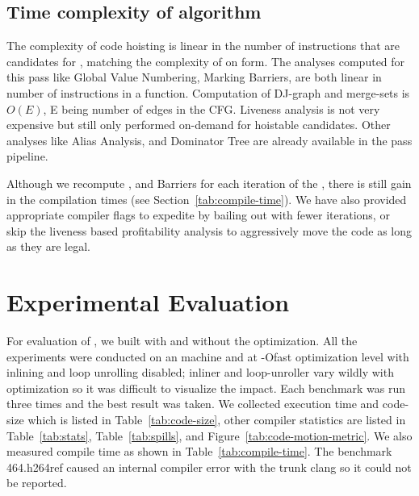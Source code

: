 \documentclass[sigplan,10pt,review,anonymous]{acmart}\settopmatter{printfolios=true,printccs=false,printacmref=false}
\begin{document}
\subsection{Time complexity of algorithm}
The complexity of code hoisting is linear in the number of instructions that are
candidates for \gcm{}, matching the complexity of \PRE{} on \SSA{} form.  The
analyses computed for this pass like Global Value Numbering, Marking Barriers,
are both linear in number of instructions in a function. Computation of DJ-graph
and merge-sets is $O(E)$, E being number of edges in the CFG. Liveness analysis
is not very expensive \cite{das2012} but still only performed on-demand for
hoistable candidates. Other analyses like Alias Analysis, \MemorySSA{} and
Dominator Tree are already available in the \LLVM{} pass pipeline.

Although we recompute \GVN{}, and Barriers for each iteration of the \gcm{},
there is still gain in the compilation times (see
Section~\ref{tab:compile-time}). We have also provided appropriate compiler
flags to expedite \gcm{} by bailing out with fewer iterations, or skip the
liveness based profitability analysis to aggressively move the code as long as
they are legal.

\section{Experimental Evaluation}
\label{sec:experimental-results}
For evaluation of \gcm{}, we built \SPEC{} with and without the \GCM{}
optimization. All the experiments were conducted on an \xlinux{} machine and at
-Ofast optimization level with inlining and loop unrolling disabled; inliner and
loop-unroller vary wildly with \GCM{} optimization so it was difficult to
visualize the impact. Each benchmark was run three times and the best result was
taken. We collected execution time and code-size which is listed in
Table~\ref{tab:code-size}, other compiler statistics are listed in
Table~\ref{tab:stats}, Table~\ref{tab:spills}, and
Figure~\ref{tab:code-motion-metric}.  We also measured compile time as shown in
Table~\ref{tab:compile-time}. The benchmark 464.h264ref caused an internal
compiler error with the trunk clang so it could not be reported.
\end{document}

